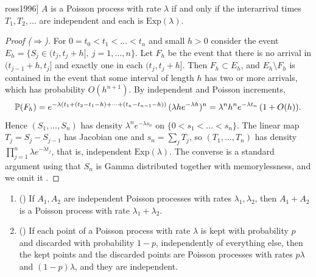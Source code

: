 \begin{theorem}[Exponential interarrival times \cite[\S2.2]{ross1996}]\label{L1:thm:interarrival}
$A$ is a Poisson process with rate $\lambda$ if and only if the interarrival times
$T_1,T_2,\dots$ are independent and each is $\mathrm{Exp}(\lambda)$.
\end{theorem}

\begin{proof}[Proof ($\Rightarrow$)]
For $0=t_0<t_1<\dots<t_n$ and small $h>0$ consider the event
$E_h=\{S_j\in(t_j,t_j+h],\ j=1,\dots,n\}$. Let $F_h$ be the event that there is no
arrival in $(t_{j-1}+h,t_j]$ and exactly one in each $(t_j,t_j+h]$. Then
$F_h\subset E_h$, and $E_h\setminus F_h$ is contained in the event that some interval
of length $h$ has two or more arrivals, which has probability $O(h^{n+1})$. By
independent and Poisson increments,
\[
  \mathbb{P}(F_h)=e^{-\lambda(t_1+(t_2-t_1-h)+\cdots+(t_n-t_{n-1}-h))}\,(\lambda h e^{-\lambda h})^n
  =\lambda^n h^n e^{-\lambda t_n}\,(1+O(h)).
\]
Hence $(S_1,\dots,S_n)$ has density $\lambda^ne^{-\lambda s_n}$ on
$\{0<s_1<\dots<s_n\}$. The linear map $T_j=S_j-S_{j-1}$ has Jacobian one and
$s_n=\sum_jT_j$, so $(T_1,\dots,T_n)$ has density $\prod_{j=1}^n\lambda e^{-\lambda t_j}$,
that is, independent $\mathrm{Exp}(\lambda)$. The converse is a standard argument
using that $S_n$ is Gamma distributed together with memorylessness, and we omit it
\cite[\S2.2]{ross1996}.
\end{proof}

\begin{proposition}\label{prop:superpose}
\begin{enumerate}[label=(\roman*)]
\item () If $A_1,A_2$ are independent Poisson processes with rates
  $\lambda_1,\lambda_2$, then $A_1+A_2$ is a Poisson process with rate
  $\lambda_1+\lambda_2$.
\item () If each point of a Poisson process with rate $\lambda$ is kept
  with probability $p$ and discarded with probability $1-p$, independently of
  everything else, then the kept points and the discarded points are Poisson
  processes with rates $p\lambda$ and $(1-p)\lambda$, and they are independent.
\end{enumerate}
\end{proposition}

